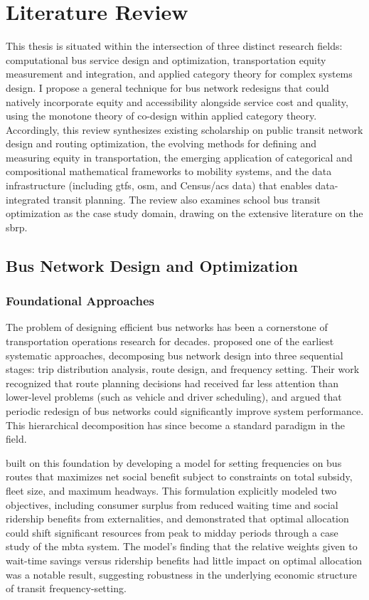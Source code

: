 \chapter{Literature Review}
\label{ch:litreview}

This thesis is situated within the intersection of three distinct research fields: computational bus service design and optimization, transportation equity measurement and integration, and applied category theory for complex systems design. I propose a general technique for bus network redesigns that could natively incorporate equity and accessibility alongside service cost and quality, using the monotone theory of co-design within applied category theory. Accordingly, this review synthesizes existing scholarship on public transit network design and routing optimization, the evolving methods for defining and measuring equity in transportation, the emerging application of categorical and compositional mathematical frameworks to mobility systems, and the data infrastructure (including \gls{gtfs}, \gls{osm}, and Census/\gls{acs} data) that enables data-integrated transit planning. The review also examines school bus transit optimization as the case study domain, drawing on the extensive literature on the \gls{sbrp}.


\section{Bus Network Design and Optimization}

\subsection{Foundational Approaches}

The problem of designing efficient bus networks has been a cornerstone of transportation operations research for decades. \textcite{cederBusNetworkDesign1986} proposed one of the earliest systematic approaches, decomposing bus network design into three sequential stages: trip distribution analysis, route design, and frequency setting. Their work recognized that route planning decisions had received far less attention than lower-level problems (such as vehicle and driver scheduling), and argued that periodic redesign of bus networks could significantly improve system performance. This hierarchical decomposition has since become a standard paradigm in the field.

\textcite{furthSettingFrequenciesBus1981} built on this foundation by developing a model for setting frequencies on bus routes that maximizes net social benefit subject to constraints on total subsidy, fleet size, and maximum headways. This formulation explicitly modeled two objectives, including consumer surplus from reduced waiting time and social ridership benefits from externalities, and demonstrated that optimal allocation could shift significant resources from peak to midday periods through a case study of the \gls{mbta} system. The model's finding that the relative weights given to wait-time savings versus ridership benefits had little impact on optimal allocation was a notable result, suggesting robustness in the underlying economic structure of transit frequency-setting.

